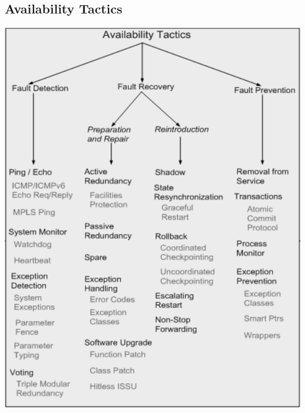 \documentclass[a4paper]{article}
\begin{document}
\subsection{Availability Tactics}
\begin{center}
\includegraphics[scale=0.6]{images/abcdefg.png}
\end{center}
\end{document}

